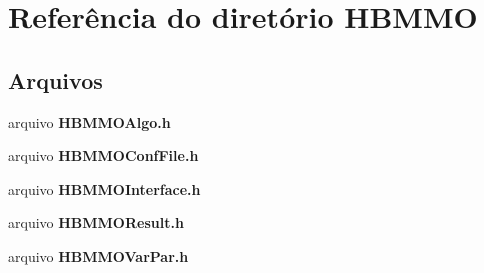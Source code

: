 \section{Referência do diretório H\+B\+M\+MO}
\label{dir_6fe5e34819cf70d8720da1f7d4b09fda}
\subsection*{Arquivos}
\begin{DoxyCompactItemize}
\item 
arquivo {\bf H\+B\+M\+M\+O\+Algo.\+h}
\item 
arquivo {\bf H\+B\+M\+M\+O\+Conf\+File.\+h}
\item 
arquivo {\bf H\+B\+M\+M\+O\+Interface.\+h}
\item 
arquivo {\bf H\+B\+M\+M\+O\+Result.\+h}
\item 
arquivo {\bf H\+B\+M\+M\+O\+Var\+Par.\+h}
\end{DoxyCompactItemize}
